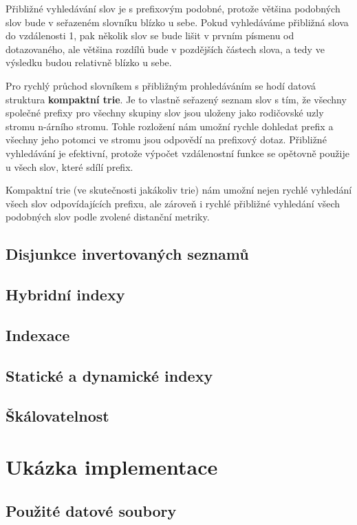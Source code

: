 \documentclass[11pt]{article}
\begin{document}
Přibližné vyhledávání slov je s prefixovým podobné, protože většina podobných
slov bude v seřazeném slovníku blízko u sebe. Pokud vyhledáváme přibližná slova
do vzdálenosti 1, pak několik slov se bude lišit v prvním písmenu od
dotazovaného, ale většina rozdílů bude v pozdějších částech slova, a tedy ve
výsledku budou relativně blízko u sebe.

Pro rychlý průchod slovníkem s přibližným prohledáváním se hodí datová
struktura \textbf{kompaktní trie}. Je to vlastně seřazený seznam slov s tím, že
všechny společné prefixy pro všechny skupiny slov jsou uloženy jako rodičovské
uzly stromu n-árního stromu. Tohle rozložení nám umožní rychle dohledat prefix
a všechny jeho potomci ve stromu jsou odpovědí na prefixový dotaz. Přibližné
vyhledávání je efektivní, protože výpočet vzdálenostní funkce se opětovně
použije u všech slov, které sdílí prefix.

Kompaktní trie (ve skutečnosti jakákoliv trie) nám umožní nejen rychlé
vyhledání všech slov odpovídajících prefixu, ale zároveň i rychlé přibližné
vyhledání všech podobných slov podle zvolené distanční metriky.

\subsection{Disjunkce invertovaných seznamů}
\subsection{Hybridní indexy}
\subsection{Indexace}
\subsection{Statické a dynamické indexy}
\subsection{Škálovatelnost}

\section{Ukázka implementace}
\subsection{Použité datové soubory}
\end{document}
